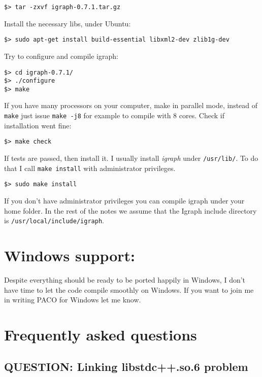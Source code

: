 \documentclass[11pt,%
              a4paper,%
]{article}
\begin{document}
\begin{verbatim}
$> tar -zxvf igraph-0.7.1.tar.gz
\end{verbatim}
Install the necessary libs, under Ubuntu:

\begin{verbatim}
$> sudo apt-get install build-essential libxml2-dev zlib1g-dev
\end{verbatim}
Try to configure and compile igraph:

\begin{verbatim}
$> cd igraph-0.7.1/
$> ./configure
$> make 
\end{verbatim}
If you have many processors on your computer, make in parallel mode,  instead of \texttt{make} just issue \texttt{make\ -j8} for example to   compile with 8 cores.
Check if installation went fine:

\begin{verbatim}
$> make check
\end{verbatim}

If tests are passed, then install it. I usually install \emph{igraph}  under \texttt{/usr/lib/}. To do that I call \texttt{make\ install} with administrator privileges.

\begin{verbatim}
$> sudo make install
\end{verbatim}
If you don't have administrator privileges you can compile igraph under your home folder.
In the rest of the notes we assume that the Igraph include directory is
\texttt{/usr/local/include/igraph}.

\section{Windows support:}\label{windows-support}

Despite everything should be ready to be ported happily in Windows, I
don't have time to let the code compile smoothly on Windows. If you want
to join me in writing PACO for Windows let me know.

\section{Frequently asked questions}

\subsection{QUESTION: Linking libstdc++.so.6
problem}\label{linking-libstdc.so.6-problem}
\end{document}
